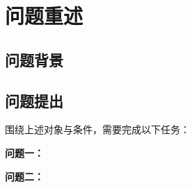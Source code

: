 \section{问题重述}

\subsection{问题背景}


\subsection{问题提出}


围绕上述对象与条件，需要完成以下任务：

\noindent\textbf{问题一：} %

\noindent\textbf{问题二：} %
